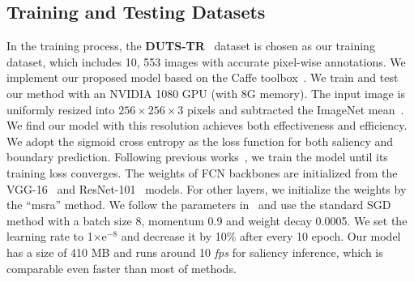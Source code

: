 \documentclass[journal]{IEEEtran}
\begin{document}
\subsection{Training and Testing Datasets}
\label{Dataset}
In the training process, the \textbf{DUTS-TR}~\cite{Lijun2017Learning} dataset is chosen as our training dataset, which includes 10, 553 images with accurate pixel-wise annotations.
%
We implement our proposed model based on the Caffe toolbox~\cite{jia2014caffe}.
%
We train and test our method with an NVIDIA 1080 GPU (with 8G memory).
%
%
The input image is uniformly resized into $256\times256\times3$ pixels and subtracted the ImageNet mean~\cite{deng2009imagenet}.
%
We find our model with this resolution achieves both effectiveness and efficiency.
%
We adopt the sigmoid cross entropy as the loss function for both saliency and boundary prediction.
%
Following previous works~\cite{Zhang2017Amulet,Zhang2017Learning,Zhang2018Salient}, we train the model until its training loss converges.
The weights of FCN backbones are initialized from the VGG-16~\cite{simonyan2014very} and ResNet-101~\cite{He2016Deep} models.
For other layers, we initialize the weights by the ``msra'' method.
%
We follow the parameters in~\cite{Zhang2017Amulet} and use the standard SGD method with a batch size 8, momentum 0.9 and weight decay 0.0005.
%
We set the learning rate to 1$\times$e$^{-8}$ and decrease it by 10\% after every 10 epoch.
%
%
Our model has a size of 410 MB and runs around 10 \emph{fps} for saliency inference, which is comparable even faster than most of methods.
%
\end{document}
